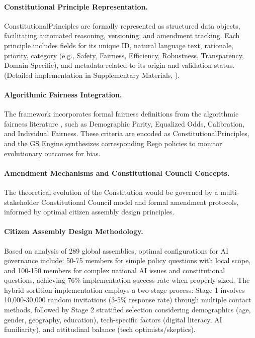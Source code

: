 \documentclass[manuscript,screen,9pt]{acmart}
\begin{document}
\paragraph{Constitutional Principle Representation.} ConstitutionalPrinciples are formally represented as structured data objects, facilitating automated reasoning, versioning, and amendment tracking. Each principle includes fields for its unique ID, natural language text, rationale, priority, category (e.g., Safety, Fairness, Efficiency, Robustness, Transparency, Domain-Specific), and metadata related to its origin and validation status. (Detailed implementation in Supplementary Materials, ).

\paragraph{Algorithmic Fairness Integration.} The framework incorporates formal fairness definitions from the algorithmic fairness literature \cite{Barocas2023FairnessML, Hardt2016EqualityOpportunity, Chouldechova2017FairPrediction, Dwork2012DifferentialPrivacy}, such as Demographic Parity, Equalized Odds, Calibration, and Individual Fairness. These criteria are encoded as ConstitutionalPrinciples, and the GS Engine synthesizes corresponding Rego policies to monitor evolutionary outcomes for bias.

\paragraph{Amendment Mechanisms and Constitutional Council Concepts.} The theoretical evolution of the Constitution would be governed by a multi-stakeholder Constitutional Council model and formal amendment protocols, informed by optimal citizen assembly design principles.

\paragraph{Citizen Assembly Design Methodology.} Based on analysis of 289 global assemblies, optimal configurations for AI governance include: 50-75 members for simple policy questions with local scope, and 100-150 members for complex national AI issues and constitutional questions, achieving 76\% implementation success rate when properly sized. The hybrid sortition implementation employs a two-stage process: Stage 1 involves 10,000-30,000 random invitations (3-5\% response rate) through multiple contact methods, followed by Stage 2 stratified selection considering demographics (age, gender, geography, education), tech-specific factors (digital literacy, AI familiarity), and attitudinal balance (tech optimists/skeptics).
\end{document}

